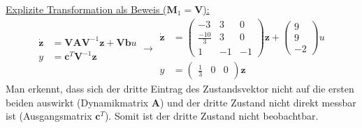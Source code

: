 \documentclass{article}
\begin{document}
\begin{task}
\begin{enumerate}[i]
\begin{solution}
 \underline{Explizite Transformation als Beweis ($\mathbf{M}_1 = \mathbf{V}$):}
 \[ \begin{aligned}\dot{\mathbf{z}} &= \mathbf{V}\mathbf{A}\mathbf{V}^{-1}\mathbf{z}+\mathbf{V}\mathbf{b}u\\
 y &= \mathbf{c}^T \mathbf{V}^{-1}\mathbf{z}
 \end{aligned} \rightarrow
 \begin{aligned}\dot{\mathbf{z}} &= 
 \begin{pmatrix}
 -3 & 3 & 0\\
 \frac{-10}{3} & 3 & 0\\
 1 & -1 & -1
 \end{pmatrix}
 \mathbf{z}+
 \begin{pmatrix}
 9\\9\\-2
 \end{pmatrix}
 u\\
 y &= \begin{pmatrix}
 \frac{1}{3}&0&0
 \end{pmatrix}\mathbf{z}
 \end{aligned}
 \]
 Man erkennt, dass sich der dritte Eintrag des Zustandsvektor nicht auf die ersten beiden auswirkt (Dynamikmatrix $\mathbf{A}$) und der dritte Zustand nicht direkt messbar ist (Ausgangsmatrix $\mathbf{c}^T$). Somit ist der dritte Zustand nicht beobachtbar.
 \end{solution}
 \end{enumerate}
\end{task}
\end{document}
